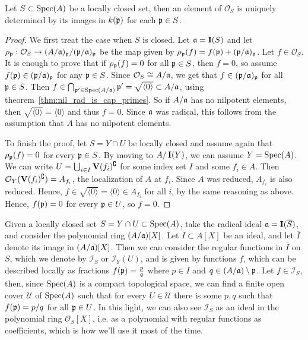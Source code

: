 \begin{lemma}\label{lem:O_Y_unique}
  Let $S \subset \operatorname{Spec}(A)$ be a locally closed set, then an element of $\mathcal O_{S}$ is uniquely determined by its images in $k(\mathfrak p)$ for each $\mathfrak p \in S$.
\end{lemma}
\begin{proof}
  We first treat the case when $S$ is closed. Let $\mathfrak{a} = \operatorname{\mathbf I}(S)$ and let $\rho_{\mathfrak p} : \mathcal O_{S} \to (A/\mathfrak{a})_{\mathfrak p}/(\mathfrak p/\mathfrak{a})_{\mathfrak p}$ be the map given by $\rho_{\mathfrak p}(f) = f(\mathfrak p) + (\mathfrak p/\mathfrak{a})_{\mathfrak p}$. Let $f \in \mathcal O_{S}$. It is enough to prove that if $\rho_{\mathfrak p}(f) = 0$ for all $\mathfrak p \in S$, then $f = 0$, so assume $f(\mathfrak p) \in (\mathfrak p/\mathfrak{a})_{\mathfrak p}$ for any $\mathfrak p \in S$. Since $\mathcal O_{S} \cong A/\mathfrak{a}$, we get that $f \in (\mathfrak p/\mathfrak{a})_{\mathfrak p}$ for all $\mathfrak p \in S$. Then $f \in \bigcap_{\mathfrak p' \in \operatorname{Spec}(A/\mathfrak{a})} \mathfrak p' = \sqrt{\langle 0 \rangle} \subset A/\mathfrak{a}$, using theorem~\ref{thm:nil_rad_is_cap_primes}. So if $A/\mathfrak{a}$ has no nilpotent elements, then $\sqrt{\langle 0 \rangle} = \langle 0 \rangle$ and thus $f = 0$. Since $\mathfrak{a}$ was radical, this follows from the assumption that $A$ has no nilpotent elements.

  To finish the proof, let $S = Y \cap U$ be locally closed and assume again that $\rho_{\mathfrak p}(f) = 0$ for every $\mathfrak p \in S$. By moving to $A/\operatorname{\mathbf I}(Y)$, we can assume $Y = \operatorname{Spec}(A)$. We can write $U = \bigcup_{i \in I} \operatorname{\mathbf V}(f_{i})^{\complement}$ for some index set $I$ and some $f_{i} \in A$. Then $\mathcal O_{Y}(\operatorname{\mathbf V}(f_{i})^{\complement}) = A_{f_{i}}$, the localization of $A$ at $f_{i}$. Since $A$ was reduced, $A_{f_{i}}$ is also reduced. Hence, $f \in \sqrt{\langle 0 \rangle} = \langle 0 \rangle \in A_{f_{i}}$ for all $i$, by the same reasoning as above. Hence, $f(\mathfrak p) = 0$ for every $\mathfrak p \in U$, so $f = 0$.
\end{proof}

Given a locally closed set $S = Y \cap U \subset \operatorname{Spec}(A)$, take the radical ideal $\mathfrak{a} = \operatorname{\mathbf I}(\overline S)$, and consider the polynomial ring $(A/\mathfrak{a})[X]$. Let $I \subset A[X]$ be an ideal, and let $\overline I$ denote its image in $(A/\mathfrak{a})[X]$. Then we can consider the regular functions in $\overline I$ on $S$, which we denote by $\mathcal I_{S}$ or $\mathcal I_{Y}(U)$, and is given by functions $f$, which can be described locally as fractions $f(\mathfrak p) = \frac p q$ where $p \in \overline I$ and $q \in (A/\mathfrak{a}) \setminus \mathfrak p$. Let $f \in \mathcal I_{S}$, then, since $\operatorname{Spec}(A)$ is a compact topological space, we can find a finite open cover $\mathcal U$ of $\operatorname{Spec}(A)$ such that for every $U \in \mathcal U$ there is some $p, q$ such that $f(\mathfrak p) = p/q$ for all $\mathfrak p \in U$. In this light, we can also see $\mathcal I_{S}$ as an ideal in the polynomial ring $\mathcal O_{S}[X]$, i.e. as a polynomial with regular functions as coefficients, which is how we'll use it most of the time.


